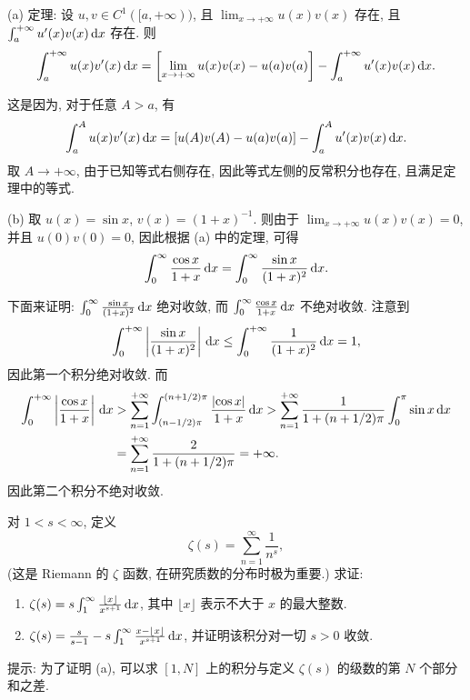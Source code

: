 \documentclass{article}
\begin{document}
\begin{solution}
  (a) 定理: 设 \( u,v\in C^1([a,+\infty)) \), 且 \( \lim_{x\to+\infty}u(x)v(x) \) 存在, 且 \( \int_{a}^{+\infty}u'(x)v(x)\,\mathrm{d} x \) 存在. 则
  \[ \int_{a}^{+\infty}u(x)v'(x)\,\mathrm{d} x = \left[ \lim_{x\to+\infty}u(x)v(x) - u(a)v(a) \right] - \int_{a}^{+\infty}u'(x)v(x)\,\mathrm{d} x. \]

  这是因为, 对于任意 \( A>a \), 有
  \[ \int_{a}^{A}u(x)v'(x)\,\mathrm{d} x = \left[ u(A)v(A) - u(a)v(a)  \right]- \int_{a}^{A}u'(x)v(x)\,\mathrm{d} x. \]
  取 \( A\to+\infty \), 由于已知等式右侧存在, 因此等式左侧的反常积分也存在, 且满足定理中的等式.

  (b) 取 \( u(x)=\sin x \), \( v(x)=(1+x)^{-1} \). 则由于 \( \lim_{x\to+\infty}u(x)v(x)=0 \), 并且 \( u(0)v(0)=0 \), 因此根据 (a) 中的定理, 可得
  \[ \int_0^\infty \frac{\cos x}{1+x}\,\mathrm{d} x = \int_0^\infty \frac{\sin x}{(1+x)^2}\,\mathrm{d} x. \]

  下面来证明: \( \int_0^\infty \frac{\sin x}{(1+x)^2}\,\mathrm{d} x \) 绝对收敛, 而 \( \int_0^\infty \frac{\cos x}{1+x}\,\mathrm{d} x \) 不绝对收敛. 注意到
  \[ \int_{0}^{+\infty}\left|\frac{\sin x}{(1+x)^2}\right|\,\mathrm{d} x\le \int_{0}^{+\infty}\frac{1}{(1+x)^2}\,\mathrm{d} x=1, \]
  因此第一个积分绝对收敛. 而
  \begin{align*}
    \int_{0}^{+\infty}\left|\frac{\cos x}{1+x}\right|\,\mathrm{d} x
    &>\sum_{n=1}^{+\infty}\int_{(n-1/2)\pi}^{(n+1/2)\pi}\frac{\left|\cos x\right|}{1+x}\,\mathrm{d} x
    >\sum_{n=1}^{+\infty}\frac{1}{1+(n+1/2)\pi}\int_0^{\pi}\sin x\,\mathrm{d} x\\
    &=\sum_{n=1}^{+\infty}\frac{2}{1+(n+1/2)\pi}=+\infty.
  \end{align*}
  因此第二个积分不绝对收敛.
\end{solution}



\begin{problem}
对 $1<s<\infty$, 定义
\[
\zeta(s)=\sum_{n=1}^\infty \frac{1}{n^s},
\]
(这是 Riemann 的 $\zeta$ 函数, 在研究质数的分布时极为重要.) 求证:
\begin{enumerate}[label=(\alph*)]
\item $\zeta(s)= s\int_1^\infty \frac{\lfloor x\rfloor}{x^{s+1}}\,\mathrm{d} x$, 其中 $\lfloor x\rfloor$ 表示不大于 $x$ 的最大整数.
\item $\zeta(s)= \frac{s}{s-1} - s\int_1^\infty \frac{x-\lfloor x\rfloor}{x^{s+1}}\,\mathrm{d} x$, 并证明该积分对一切 $s>0$ 收敛.
\end{enumerate}
提示: 为了证明 (a), 可以求 $[1,N]$ 上的积分与定义 $\zeta(s)$ 的级数的第 $N$ 个部分和之差.
\end{problem}
\end{document}
